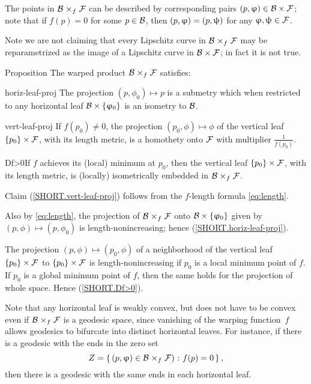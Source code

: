 The points in $\spc{B}\warp f\spc{F}$ can be described by corresponding pairs $(p,\phi)\in\spc{B}\times\spc{F}$; note that if $f(p)=0$ for some $p\in \spc{B}$, then $(p,\phi)\z=(p,\psi)$ for any $\phi,\psi\in \spc{F}$.

Note we are not claiming that every Lipschitz curve in $\spc{B}\warp f \spc{F}$ may be reparametrized as the image of a Lipschitz curve in $\spc{B}\times \spc{F}$; in fact it is not true.

\begin{thm}{Proposition}
The warped product $\spc{\spc{B}}\warp{f}\spc{F}$ satisfies:

\begin{subthm}{horiz-leaf-proj}
The projection $(p,\phi_0)\mapsto p$ is a submetry which when restricted to any horizontal leaf $\spc{B}\times\{\phi_0\}$
is an isometry to $\mathcal{B}$.
\end{subthm}

\begin{subthm}{vert-leaf-proj}
If $f(p_0)\ne0$, the projection $(p_0,\phi)\mapsto \phi$ of the vertical leaf $\{p_0\}\times \spc{F}$, with its length metric,  is a homothety onto $\mathcal{F}$ with multiplier $\tfrac1{f(p_0)}$.
\end{subthm}

\begin{subthm}{Df>0}If  $f$ achieves its (local) minimum at $p_0$, then the vertical leaf $\{p_0\} \times \spc{F}$, with its length metric, is (locally) isometrically embedded in $\spc{B}\warp{f}\spc{F}$.
\end{subthm}

\end{thm}


Claim  (\ref{SHORT.vert-leaf-proj}) follows from the $f$-length formula \ref{eq:length}.

Also by \ref{eq:length}, the projection of
$\spc{B}\warp{f}\spc{F}$ onto $\spc{B}\times\{\phi_0\}$ given by  $(p,\phi)\mapsto (p,\phi_0)$ is length-nonincreasing; hence (\ref{SHORT.horiz-leaf-proj}).

The projection $(p,\phi)\mapsto (p_0,\phi)$ of a neighborhood of the vertical leaf $\{p_0\} \times \spc{F}$ to $\{p_0\} \times \spc{F}$ is length-nonincreasing if $p_0$ is a local minimum point of $f$. 
If $p_0$ is a global minimum point of $f$, then the same holds for the projection of whole space.
Hence (\ref{SHORT.Df>0}).
\qeds

Note that any horizontal leaf is weakly convex, but does not have to be convex even if $\spc{B}\warp{f}\spc{F}$ is a geodesic space, since vanishing of the warping function~$f$ allows geodesics to bifurcate into distinct horizontal leaves.
For instance, if there is a geodesic with the ends in the zero set 
\[Z=\set{(p,\phi)\in\spc{B} \warp{f}\spc{F})}{f(p)=0},\] 
then there is a geodesic with the same ends in each horizontal leaf.

